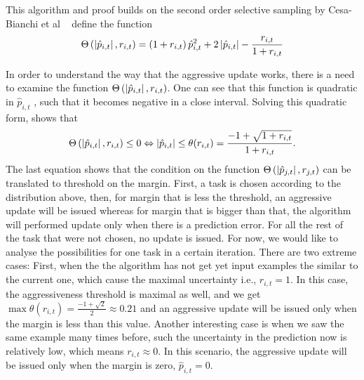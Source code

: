 

This algorithm and proof builds on the second order selective sampling by Cesa-Bianchi et al ~\cite{cesa2006worst} define the function
\begin{equation}
\Theta\left({\left\vert{\hat{p}_{i,t}}\right\vert,r_{i,t}}\right)=\left({1+r_{i,t}}\right)\hat{p}_{i,t}^2+2\left\vert{\hat{p}_{i,t}}\right\vert-\frac{r_{i,t}}{1+r_{i,t}}
\end{equation}

In order to understand the way that the aggressive update works, there is a need to examine the function $\Theta\left({\left\vert{\hat{p}_{i,t}}\right\vert,r_{i,t}}\right)$. One can see that this function is quadratic in $\hat{p}_{i,t}$ , such that it becomes negative in a close interval. Solving this quadratic form, shows that 
\begin{equation}
\Theta\left({\left\vert{\hat{p}_{i,t}}\right\vert,r_{i,t}}\right)\le0 \Leftrightarrow \left\vert{\hat{p}_{i,t}}\right\vert\le\theta({r_{i,t}})=\frac{-1+\sqrt{1+r_{i,t}}}{1+r_{i,t}}.
\end{equation}
 The last equation shows that the condition on the function $\Theta\left({\left\vert{\hat{p}_{j,t}}\right\vert,r_{j,t}}\right)$ can be translated to threshold on the margin. First, a task is chosen according to the distribution above, then, for margin that is less the threshold, an aggressive update will be issued whereas for margin that is bigger than that, the algorithm will performed update only when there is a prediction error. For 
all the rest of the task that were not chosen, no update is issued. For now, we would like to analyse the possibilities for one task in a certain iteration. There are two extreme cases: First, when the the algorithm has not get yet input examples the similar to the current one, which cause the maximal uncertainty i.e., $r_{i,t}=1$. In this case,  the aggressiveness threshold is maximal as well, and we get $\max{\theta({r_{i,t}})}=\frac{-1+\sqrt{2}}{2}\approx0.21$ and an aggressive update will be issued only when the margin is less than this value. Another interesting case is when we saw the same example many times before, such the uncertainty in the prediction now is relatively low, which means $r_{i,t}\approx0$. In this scenario, the aggressive update will be issued only when the margin is zero, $\hat{p}_{i,t}=0$. 
\\

